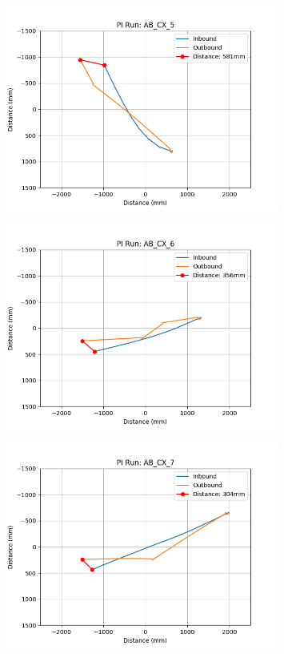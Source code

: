 \documentclass[a4paper,11pt,twoside,openright]{article}
\begin{document}
\begin{figure}[h!]
  \centering
  \includegraphics[width=0.8\textwidth]{AB_CX_5}
  \caption{\label{fig:abcx5}}
\end{figure}

\begin{figure}[h!]
  \centering
  \includegraphics[width=0.8\textwidth]{AB_CX_6}
  \caption{\label{fig:abcx6}}
\end{figure}

\begin{figure}[h!]
  \centering
  \includegraphics[width=0.8\textwidth]{AB_CX_7}
  \caption{\label{fig:abcx7}}
\end{figure}
\end{document}
